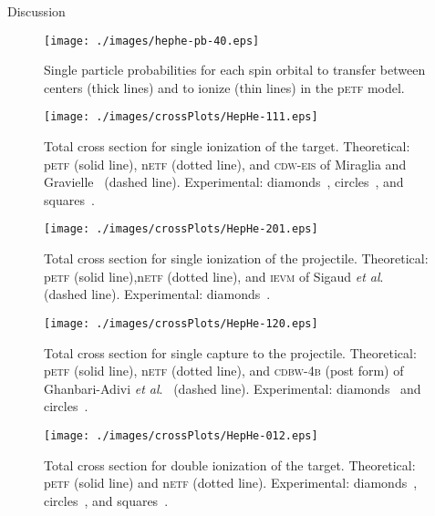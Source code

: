 \documentclass[aps, pra, reprint, groupedaddress, amsfonts, longbibliography,
               amsmath, amssymb, showpacs, nofootinbib]{revtex4-1}
\begin{document}
\begin{section}{Discussion \label{sec:disc}}

   \begin{figure}[t]
      \centering
      \texttt{[image: ./images/hephe-pb-40.eps]}
      \caption{Single particle probabilities for each spin orbital to transfer between
               centers (thick lines) and to ionize (thin lines) in the p\textsc{etf} model.
               \label{fig:pbPlot}}
   \end{figure}

   \begin{figure}[t]
      \centering
      \texttt{[image: ./images/crossPlots/HepHe-111.eps]}
      \caption{Total cross section for single ionization of the target.
               Theoretical: p\textsc{etf} (solid line), n\textsc{etf} (dotted line), and
                            \textsc{cdw-eis} of Miraglia and Gravielle~\cite{MG-10} (dashed line).
               Experimental: diamonds~\cite{Dub-89}, circles~\cite{FTFHLP-95}, and squares~\cite{DT-88}.
               \label{fig:cs111}}
   \end{figure}

   \begin{figure}[t]
      \centering
      \texttt{[image: ./images/crossPlots/HepHe-201.eps]}
      \caption{Total cross section for single ionization of the projectile.
               Theoretical: p\textsc{etf} (solid line),n\textsc{etf} (dotted line), and
                            \textsc{ievm} of Sigaud \textit{et al}.~\cite{SM-03} (dashed line).
               Experimental: diamonds~\cite{Dub-89}. \label{fig:cs201}}
   \end{figure}

   \begin{figure}[t]
      \centering
      \texttt{[image: ./images/crossPlots/HepHe-120.eps]}
      \caption{Total cross section for single capture to the projectile.
               Theoretical: p\textsc{etf} (solid line), n\textsc{etf} (dotted line), and
                            \textsc{cdbw-4b} (post form) of Ghanbari-Adivi \textit{et al}.~\cite{GAG15}
                            (dashed line).
               Experimental: diamonds~\cite{Dub-89} and circles~\cite{FTFHLP-95}. \label{fig:cs120}}
   \end{figure}

   \begin{figure}[t]
      \centering
      \texttt{[image: ./images/crossPlots/HepHe-012.eps]}
      \caption{Total cross section for double ionization of the target.
               Theoretical: p\textsc{etf} (solid line) and n\textsc{etf} (dotted line).
               Experimental: diamonds~\cite{Dub-89}, circles~\cite{FTFHLP-95}, and squares~\cite{DT-88}.
               \label{fig:cs012}}
   \end{figure}


\end{section}
\end{document}
